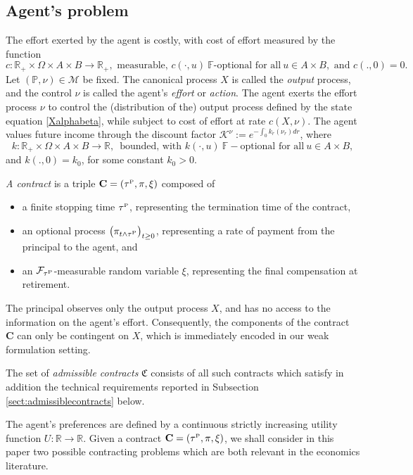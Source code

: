 \documentclass[11pt,a4paper]{article}
\numberwithin{equation}{section}
\def\dbF{\mathbb{F}}
\def\dbP{\mathbb{P}}
\def\dbR{\mathbb{R}}
\newcommand{\cF}{\mathcal{F}}
\newcommand{\cK}{\mathcal{K}}
\newcommand{\Cbf}{\mathbf{C}}
\newcommand{\frakC}{\mathfrak{C}}
\theoremstyle{definition}
\begin{document}
\subsection{Agent's problem}
The effort exerted by the agent is costly, with cost of effort measured by the function
 $$ c:\dbR_+\times\Omega\times A \times  B \rightarrow \dbR_+, \mbox{ measurable, } c(\cdot,u)~\dbF\mbox{-optional for all}~u\in A\times B,
 \mbox{ and } c(.,0)=0. 
 $$
Let $(\dbP,\nu)\in\mathcal M$ be fixed. The canonical process $X$ is called the {\it output} process, and the control $\nu$ is called the agent's {\it effort} or {\it action}. 
The agent exerts the effort process $\nu$ to control the (distribution of the) output process defined by the state equation \eqref{Xalphabeta}, while subject to cost of effort at rate $c(X,\nu)$. 
The agent values future income through the discount factor $\cK^{\nu}:=e^{-\int_0^. k_r(\nu_r)dr}$, where
  $$ k:\dbR_+\times\Omega\times A\times B\rightarrow \dbR, \, \mbox{ bounded, with } k(\cdot,u)~\dbF-\mbox{optional for all}~u\in A\times B, $$
 and $k(.,0)=k_0$, for some constant $k_0>0$.

\vspace{3mm} 
 
{\it A contract} is a triple $\Cbf=(\tau^{\scriptscriptstyle\rm P},\pi,\xi)$ composed of 
  \begin{itemize}
   \item a finite stopping time $\tau^{\scriptscriptstyle \rm P}$, representing the termination time of the contract, 
   \item an optional process $\big(\pi_{t\wedge\tau^{\scriptscriptstyle\rm P}}\big)_{t\ge 0}$, representing a rate of payment from the principal to the agent, and
   \item an $\cF_{\tau^{\scriptscriptstyle\rm P}}$-measurable random variable $\xi$, representing the final compensation at retirement.
  \end{itemize}

The principal observes only the output process $X$, and has no access to the information on the agent's effort. 
Consequently, the components of the contract $\Cbf$ can only be contingent on $X$, which is immediately encoded in our weak formulation setting.

The set of {\it admissible contracts} $\frakC$ consists of all such contracts which satisfy in addition the technical requirements reported in Subsection \ref{sect:admissiblecontracts} below.

The agent's preferences are defined by a continuous strictly increasing utility function $U:\dbR\rightarrow\dbR$. 
Given a contract $\Cbf=(\tau^{\scriptscriptstyle\rm P},\pi,\xi)$, we shall consider in this paper two possible contracting problems which are both relevant in the economics literature.
\end{document}
